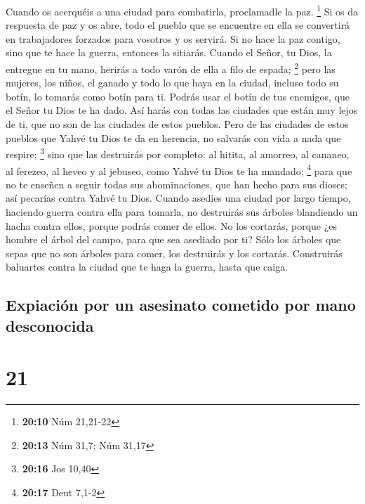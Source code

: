  Cuando os acerquéis a una ciudad para combatirla,
proclamadle la paz. \footnote{\textbf{20:10} Núm 21,21-22}
 Si os da respuesta de paz y os abre, todo el pueblo que
se encuentre en ella se convertirá en trabajadores forzados para
vosotros y os servirá.  Si no hace la paz contigo, sino
que te hace la guerra, entonces la sitiarás.  Cuando el
Señor, tu Dios, la entregue en tu mano, herirás a todo varón de ella a
filo de espada; \footnote{\textbf{20:13} Núm 31,7; Núm 31,17}
 pero las mujeres, los niños, el ganado y todo lo que
haya en la ciudad, incluso todo su botín, lo tomarás como botín para ti.
Podrás usar el botín de tus enemigos, que el Señor tu Dios te ha dado.
 Así harás con todas las ciudades que están muy lejos de
ti, que no son de las ciudades de estos pueblos.  Pero de
las ciudades de estos pueblos que Yahvé tu Dios te da en herencia, no
salvarás con vida a nada que respire; \footnote{\textbf{20:16} Jos 10,40}
 sino que las destruirás por completo: al hitita, al
amorreo, al cananeo, al ferezeo, al heveo y al jebuseo, como Yahvé tu
Dios te ha mandado; \footnote{\textbf{20:17} Deut 7,1-2} 
para que no te enseñen a seguir todas sus abominaciones, que han hecho
para sus dioses; así pecarías contra Yahvé tu Dios. 
Cuando asedies una ciudad por largo tiempo, haciendo guerra contra ella
para tomarla, no destruirás sus árboles blandiendo un hacha contra
ellos, porque podrás comer de ellos. No los cortarás, porque ¿es hombre
el árbol del campo, para que sea asediado por ti?  Sólo
los árboles que sepas que no son árboles para comer, los destruirás y
los cortarás. Construirás baluartes contra la ciudad que te haga la
guerra, hasta que caiga.

\hypertarget{expiaciuxf3n-por-un-asesinato-cometido-por-mano-desconocida}{%
\subsection{Expiación por un asesinato cometido por mano
desconocida}\label{expiaciuxf3n-por-un-asesinato-cometido-por-mano-desconocida}}

\hypertarget{section-20}{%
\section{21}\label{section-20}}

